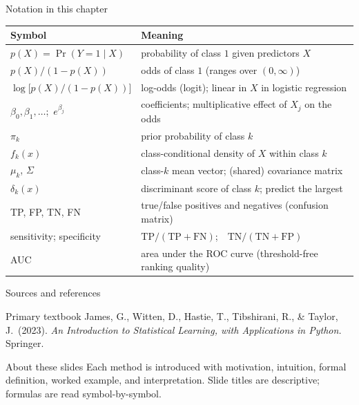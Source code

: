 \documentclass[aspectratio=169,11pt]{beamer}
\begin{document}
\begin{frame}{Notation in this chapter}
  \footnotesize
  \begin{center}
  \begin{tabular}{@{}ll@{}}
    \toprule
    \textbf{Symbol} & \textbf{Meaning} \\
    \midrule
    $p(X)=\Pr(Y=1\mid X)$ & probability of class $1$ given predictors $X$ \\
    $p(X)/(1-p(X))$ & odds of class $1$ (ranges over $(0,\infty)$) \\
    $\log\bigl[p(X)/(1-p(X))\bigr]$ & log-odds (logit); linear in $X$ in logistic regression \\
    $\beta_0,\beta_1,\dots$;\ $e^{\beta_j}$ & coefficients; multiplicative effect of $X_j$ on the odds \\
    $\pi_k$ & prior probability of class $k$ \\
    $f_k(x)$ & class-conditional density of $X$ within class $k$ \\
    $\mu_k$, $\Sigma$ & class-$k$ mean vector; (shared) covariance matrix \\
    $\delta_k(x)$ & discriminant score of class $k$; predict the largest \\
    TP, FP, TN, FN & true/false positives and negatives (confusion matrix) \\
    sensitivity; specificity & $\mathrm{TP}/(\mathrm{TP}+\mathrm{FN})$;\ \ $\mathrm{TN}/(\mathrm{TN}+\mathrm{FP})$ \\
    AUC & area under the ROC curve (threshold-free ranking quality) \\
    \bottomrule
  \end{tabular}
  \end{center}
\end{frame}

\begin{frame}{Sources and references}
  \begin{block}{Primary textbook}
    James, G., Witten, D., Hastie, T., Tibshirani, R., \& Taylor, J.\ (2023).
    \emph{An Introduction to Statistical Learning, with Applications in
    Python.} Springer.
  \end{block}
  \begin{block}{About these slides}
    Each method is introduced with motivation, intuition, formal
    definition, worked example, and interpretation. Slide titles are
    descriptive; formulas are read symbol-by-symbol.
  \end{block}
\end{frame}
\end{document}
